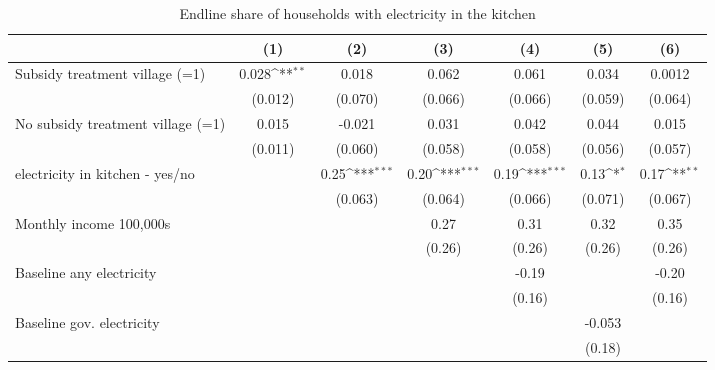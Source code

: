 \begin{table}[htbp]\centering
\def\sym#1{\ifmmode^{#1}\else\(^{#1}\)\fi}
\caption{Endline share of households with electricity in the kitchen}
\begin{tabular*}{1\hsize}{@{\hskip\tabcolsep\extracolsep\fill}l*{6}{c}}
\toprule
                &\multicolumn{1}{c}{(1)}         &\multicolumn{1}{c}{(2)}         &\multicolumn{1}{c}{(3)}         &\multicolumn{1}{c}{(4)}         &\multicolumn{1}{c}{(5)}         &\multicolumn{1}{c}{(6)}         \\
\midrule
Subsidy treatment village (=1)&    0.028\sym{**} &    0.018         &    0.062         &    0.061         &    0.034         &   0.0012         \\
                &  (0.012)         &  (0.070)         &  (0.066)         &  (0.066)         &  (0.059)         &  (0.064)         \\
No subsidy treatment village (=1)&    0.015         &   -0.021         &    0.031         &    0.042         &    0.044         &    0.015         \\
                &  (0.011)         &  (0.060)         &  (0.058)         &  (0.058)         &  (0.056)         &  (0.057)         \\
electricity in kitchen - yes/no&                  &     0.25\sym{***}&     0.20\sym{***}&     0.19\sym{***}&     0.13\sym{*}  &     0.17\sym{**} \\
                &                  &  (0.063)         &  (0.064)         &  (0.066)         &  (0.071)         &  (0.067)         \\
Monthly income 100,000s&                  &                  &     0.27         &     0.31         &     0.32         &     0.35         \\
                &                  &                  &   (0.26)         &   (0.26)         &   (0.26)         &   (0.26)         \\
Baseline any electricity&                  &                  &                  &    -0.19         &                  &    -0.20         \\
                &                  &                  &                  &   (0.16)         &                  &   (0.16)         \\
Baseline gov. electricity&                  &                  &                  &                  &   -0.053         &                  \\
                &                  &                  &                  &                  &   (0.18)         &                  \\

\end{tabular*}
\end{table}
